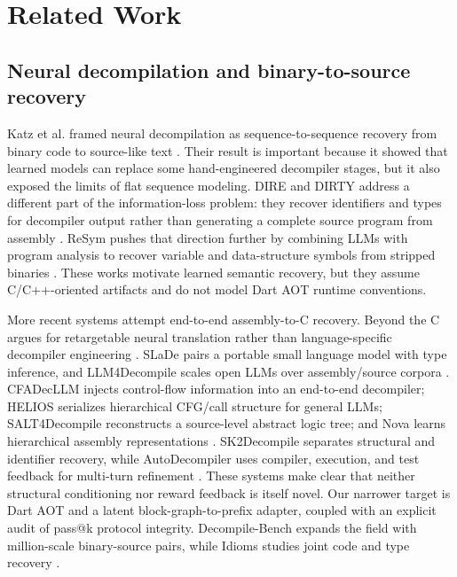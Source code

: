 \documentclass[11pt]{article}
\begin{document}
\section{Related Work}

\subsection{Neural decompilation and binary-to-source recovery}

Katz et al. framed neural decompilation as sequence-to-sequence recovery from binary code to source-like text \cite{katz2018rnn}. Their result is important because it showed that learned models can replace some hand-engineered decompiler stages, but it also exposed the limits of flat sequence modeling. DIRE and DIRTY address a different part of the information-loss problem: they recover identifiers and types for decompiler output rather than generating a complete source program from assembly \cite{lacomis2019dire,chen2022dirty}. ReSym pushes that direction further by combining LLMs with program analysis to recover variable and data-structure symbols from stripped binaries \cite{xie2024resym}. These works motivate learned semantic recovery, but they assume C/C++-oriented artifacts and do not model Dart AOT runtime conventions.

More recent systems attempt end-to-end assembly-to-C recovery. Beyond the C argues for retargetable neural translation rather than language-specific decompiler engineering \cite{hosseini2022beyondc}. SLaDe pairs a portable small language model with type inference, and LLM4Decompile scales open LLMs over assembly/source corpora \cite{armengol2023slade,tan2024llm4decompile}. CFADecLLM injects control-flow information into an end-to-end decompiler; HELIOS serializes hierarchical CFG/call structure for general LLMs; SALT4Decompile reconstructs a source-level abstract logic tree; and Nova learns hierarchical assembly representations \cite{liu2025cfadecllm,achamyeleh2026helios,wang2025salt4decompile,jiang2025nova}. SK2Decompile separates structural and identifier recovery, while AutoDecompiler uses compiler, execution, and test feedback for multi-turn refinement \cite{tan2025sk2decompile,liu2026autodecompiler}. These systems make clear that neither structural conditioning nor reward feedback is itself novel. Our narrower target is Dart AOT and a latent block-graph-to-prefix adapter, coupled with an explicit audit of pass@k protocol integrity. Decompile-Bench expands the field with million-scale binary-source pairs, while Idioms studies joint code and type recovery \cite{tan2025decompilebench,dramko2025idioms}.
\end{document}
